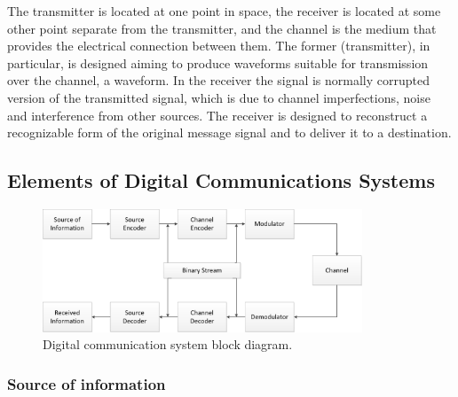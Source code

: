 The transmitter is located at one point in space, the receiver is located at
some other point separate from the transmitter, and the channel is the medium
that provides the electrical connection between them. The former (transmitter),
in particular, is designed aiming to produce waveforms suitable for transmission
over the channel, a waveform. In the receiver the signal is normally corrupted
version of the transmitted signal, which is due to channel imperfections, noise
and interference from other sources. The receiver is designed to reconstruct a
recognizable form of the original message signal and to deliver it to a
destination.

%
%
%
%
%

\subsection{Elements of Digital Communications Systems}

\begin{figure}[htbp]
    \centering
    \includegraphics[width=0.85\textwidth]{./figures/digicom_bd}
    \caption{ Digital communication system block diagram.
    \label{fig:digcombd}}
\end{figure}

\subsubsection{Source of information}

